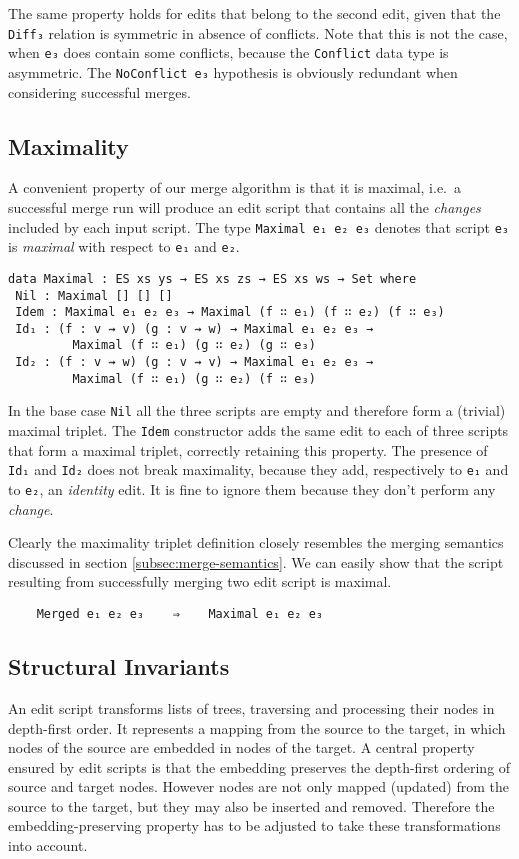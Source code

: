 \documentclass[preprint]{sigplanconf}
\begin{document}
    The same property holds for edits that belong to the second edit, given
    that the \texttt{Diff₃} relation is symmetric in absence of conflicts.	
    Note that this is not the case, when \texttt{e₃} does contain some conflicts,
    because the \texttt{Conflict} data type is asymmetric.
    The \texttt{NoConflict e₃} hypothesis is obviously redundant when
    considering successful merges.
    		
    \subsection{Maximality}
    A convenient property of our merge algorithm is that it is maximal, i.e.\ a successful 
    merge run will produce an edit script that contains all the \emph{changes} included
    by each input script. The type \texttt{Maximal e₁ e₂ e₃} denotes that  
    script \texttt{e₃} is \emph{maximal} with respect to \texttt{e₁} and \texttt{e₂}.
	
\begin{verbatim}
data Maximal : ES xs ys → ES xs zs → ES xs ws → Set where
 Nil : Maximal [] [] []
 Idem : Maximal e₁ e₂ e₃ → Maximal (f ∷ e₁) (f ∷ e₂) (f ∷ e₃)
 Id₁ : (f : v ⇝ v) (g : v ⇝ w) → Maximal e₁ e₂ e₃ → 
         Maximal (f ∷ e₁) (g ∷ e₂) (g ∷ e₃)
 Id₂ : (f : v ⇝ w) (g : v ⇝ v) → Maximal e₁ e₂ e₃ → 
         Maximal (f ∷ e₁) (g ∷ e₂) (f ∷ e₃)
\end{verbatim}

    In the base case \texttt{Nil} all the three scripts
    are empty and therefore form a (trivial) maximal triplet.
    The \texttt{Idem} constructor adds the same edit to each of three scripts 
    that form a maximal triplet, correctly retaining this property.
    The presence of \texttt{Id₁} and \texttt{Id₂} does not break maximality, because
    they add, respectively to \texttt{e₁} and to \texttt{e₂}, an \emph{identity} edit.
    It is fine to ignore them because they don't perform any \emph{change}.

    Clearly the maximality triplet definition closely resembles the merging semantics discussed
    in section \ref{subsec:merge-semantics}. We can easily show that the script resulting from
    successfully merging two edit script is maximal.
\begin{verbatim}
    Merged e₁ e₂ e₃    ⇒    Maximal e₁ e₂ e₃
\end{verbatim}

    \subsection{Structural  Invariants}
    An edit script transforms lists of trees, traversing and processing 
    their nodes in depth-first order.
    It represents a mapping from the source to the target, in which 
    nodes of the source are embedded in nodes of the target.
    A central property ensured by edit scripts is that the 
    embedding preserves the depth-first ordering of source and target nodes.
    However nodes are not only mapped (updated) from the source to the 
    target, but they may also be inserted and removed. 
    Therefore the embedding-preserving property has to be adjusted to
    take these transformations into account.
\end{document}
